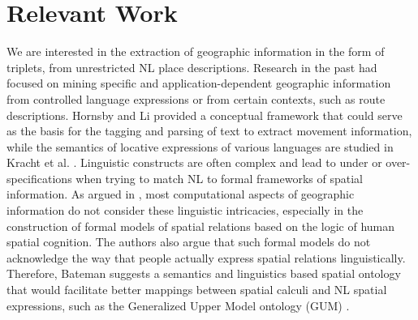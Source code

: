 \documentclass{sig-alternate}
\begin{document}
\section{Relevant Work}
We are interested in the extraction of geographic information in the form of triplets, from unrestricted NL place descriptions. Research in the past had focused on mining specific and application-dependent geographic information from controlled language expressions \cite{kelleher:perceptually, Hanjing:route, tappan:knowledge} or from certain contexts, such as route descriptions. Hornsby and Li \cite{hornsby:conceptual} provided a conceptual framework that could serve as the basis for the tagging and parsing of text to extract movement information, while the semantics of locative expressions of various languages are studied in Kracht et al. \cite{kracht:semantics}. Linguistic constructs are often complex and lead to under or over-specifications when trying to match NL to formal frameworks of spatial information. As argued in \cite{Bateman:ontology}, most computational aspects of geographic information do not consider these linguistic intricacies, especially in the construction of formal models of spatial relations based on the logic of human spatial cognition. The authors also argue that such formal models do not acknowledge the way that people actually express spatial relations linguistically. Therefore, Bateman \cite{Bateman:language} suggests a semantics and linguistics based spatial ontology that would facilitate better mappings between spatial calculi and NL spatial expressions, such as the Generalized Upper Model ontology (GUM) \cite{Bateman:data}.
\end{document}

